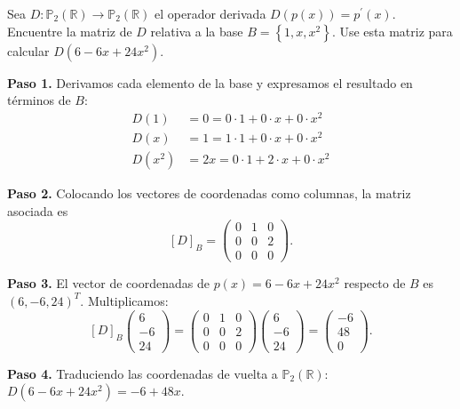\begin{example}\label{ex:tl_matriz_derivada}
Sea $D:\mathbb{P}_{2}(\mathbb{R}) \rightarrow \mathbb{P}_{2}(\mathbb{R})$ el operador derivada $D(p(x)) = p^{\prime}(x)$. Encuentre la matriz de $D$ relativa a la base $B = \left\lbrace 1, x, x^2 \right\rbrace$. Use esta matriz para calcular $D(6 - 6x + 24x^2)$.
\begin{myproof}
\textbf{Paso 1.} Derivamos cada elemento de la base y expresamos el resultado en términos de $B$:
\[
\begin{aligned}
D(1) &= 0 = 0\cdot 1 + 0\cdot x + 0\cdot x^2 \\
D(x) &= 1 = 1\cdot 1 + 0\cdot x + 0\cdot x^2 \\
D(x^2) &= 2x = 0\cdot 1 + 2\cdot x + 0\cdot x^2
\end{aligned}
\]

\textbf{Paso 2.} Colocando los vectores de coordenadas como columnas, la matriz asociada es
\[
[D]_B = \begin{pmatrix}
0 & 1 & 0 \\
0 & 0 & 2 \\
0 & 0 & 0
\end{pmatrix}.
\]

\textbf{Paso 3.} El vector de coordenadas de $p(x) = 6 - 6x + 24x^2$ respecto de $B$ es $(6, -6, 24)^T$. Multiplicamos:
\[
[D]_B \begin{pmatrix} 6 \\ -6 \\ 24 \end{pmatrix} =
\begin{pmatrix}
0 & 1 & 0 \\
0 & 0 & 2 \\
0 & 0 & 0
\end{pmatrix}
\begin{pmatrix} 6 \\ -6 \\ 24 \end{pmatrix}
=
\begin{pmatrix} -6 \\ 48 \\ 0 \end{pmatrix}.
\]

\textbf{Paso 4.} Traduciendo las coordenadas de vuelta a $\mathbb{P}_2(\mathbb{R})$: $\boxed{D(6 - 6x + 24x^2) = -6 + 48x}$.
\end{myproof}
\end{example}

